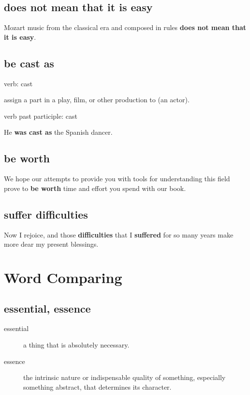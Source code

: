 \documentclass[12pt, letterpaper, onecolumn, final]{report}
\begin{document}
\section{does not mean that it is easy}
Mozart music from the classical era and composed in rules \textbf{does not mean that it is easy}.

\section{be cast as}

verb: cast

assign a part in a play, film, or other production to (an actor).

verb past participle: cast

He \textbf{was cast as} the Spanish dancer.

\section{be worth}
We hope our attempts to provide you with tools for understanding this field prove to \textbf{be worth} time and effort you spend with our book.

\section{suffer difficulties}
Now I rejoice, and those \textbf{difficulties} that I \textbf{suffered} for so many years make more dear my present blessings.

\chapter{Word Comparing}
\section{essential, essence}
\begin{description}
	\item[essential] a thing that is absolutely necessary.
	\item[essence] the intrinsic nature or indispensable quality of something, especially something abstract, that determines its character.
\end{description}
\end{document}
